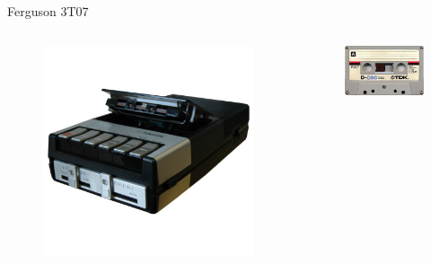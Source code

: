 \documentclass{beamer}
\begin{document}
  \begin{frame}{Ferguson 3T07}
    \begin{columns}
        \begin{figure}
          \includegraphics[scale=0.3]{images/3t07}
        \end{figure}
        \begin{figure}
          \includegraphics[scale=0.35]{images/tdkc60}
        \end{figure}
    \end{columns}
  \end{frame}
\end{document}
